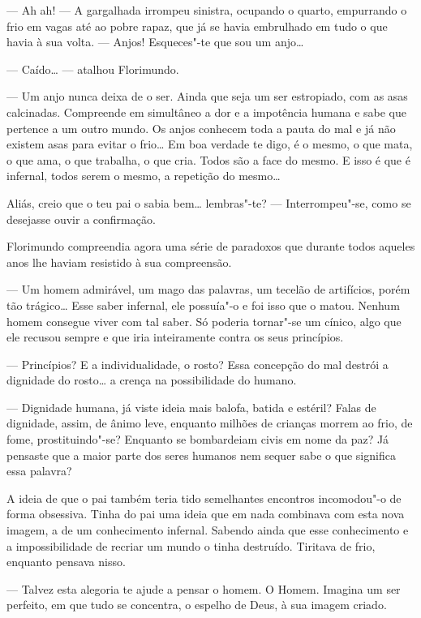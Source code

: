 --- Ah ah! --- A gargalhada irrompeu sinistra, ocupando o quarto, empurrando
o frio em vagas até ao pobre rapaz, que já se havia embrulhado em tudo o
que havia à sua volta. --- Anjos! Esqueces"-te que sou um anjo\ldots{}

--- Caído\ldots{} --- atalhou Florimundo.

--- Um anjo nunca deixa de o ser. Ainda que seja um ser estropiado, com as
asas calcinadas. Compreende em simultâneo a dor e a impotência humana e
sabe que pertence a um outro mundo. Os anjos conhecem toda a pauta do
mal e já não existem asas para evitar o frio\ldots{} Em boa verdade te
digo, é o mesmo, o que mata, o que ama, o que trabalha, o que cria.
Todos são a face do mesmo. E isso é que é infernal, todos serem o mesmo,
a repetição do mesmo\ldots{}

Aliás, creio que o teu pai o sabia bem\ldots{} lembras"-te? --- Interrompeu"-se,
como se desejasse ouvir a confirmação.

Florimundo compreendia agora uma série de paradoxos que durante todos
aqueles anos lhe haviam resistido à sua compreensão.

--- Um homem admirável, um mago das palavras, um tecelão de artifícios,
porém tão trágico\ldots{} Esse saber infernal, ele possuía"-o e foi isso que o
matou. Nenhum homem consegue viver com tal saber. Só poderia tornar"-se
um cínico, algo que ele recusou sempre e que iria inteiramente contra os
seus princípios.

--- Princípios? E a individualidade, o rosto? Essa concepção do mal
destrói a dignidade do rosto\ldots{} a crença na possibilidade do humano.

--- Dignidade humana, já viste ideia mais balofa, batida e estéril? Falas
de dignidade, assim, de ânimo leve, enquanto milhões de crianças morrem
ao frio, de fome, prostituindo"-se? Enquanto se bombardeiam civis em nome
da paz? Já pensaste que a maior parte dos seres humanos nem sequer sabe
o que significa essa palavra?

A ideia de que o pai também teria tido semelhantes encontros incomodou"-o
de forma obsessiva. Tinha do pai uma ideia que em nada combinava com
esta nova imagem, a de um conhecimento infernal. Sabendo ainda que esse
conhecimento e a impossibilidade de recriar um mundo o tinha destruído.
Tiritava de frio, enquanto pensava nisso.

--- Talvez esta alegoria te ajude a pensar o homem. O Homem. Imagina um
ser perfeito, em que tudo se concentra, o espelho de Deus, à sua imagem
criado.


